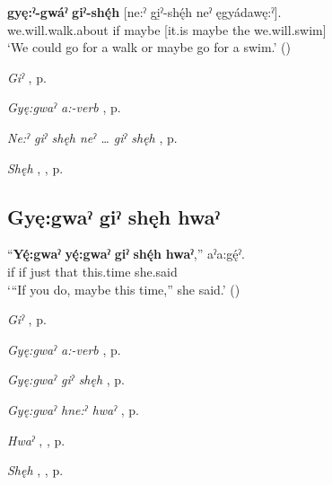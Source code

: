 \ea
\label{ex:gpar141}
 \textbf{gyę:ˀ-gwáˀ} \textbf{giˀ-shę́h} [ne:ˀ gi̱ˀ-shę́h neˀ ęgyádawę:ˀ].\\
we.will.walk.about if maybe [it.is maybe the we.will.swim]\\
\glt ‘We could go for a walk or maybe go for a swim.’ (\cite[45]{michelson_ontario_2011})
\z

\begin{CayugaRelated}
\item \textit{Giˀ} , p. \pageref{p:[giˀ]}\\
\item \textit{Gyę:gwaˀ a:-verb} , p. \pageref{p:[gyę:gwaˀ]}\\
\item \textit{Ne:ˀ giˀ shęh neˀ … giˀ shęh} , p. \pageref{p:[ne:ˀ giˀ shęh neˀ … giˀ shęh]}\\
\item \textit{Shęh} , , p. \pageref{p:[shęh] `because’}
\end{CayugaRelated}


\subsection*{\textbf{Gyę:gwaˀ giˀ shęh hwaˀ} } \label{p:[gyę:gwaˀ giˀ shęh hwaˀ]}

\ea
\label{ex:gpar142}
\gll “\textbf{Yę́:gwaˀ} \textbf{yę́:gwaˀ} \textbf{giˀ} \textbf{shę́h} \textbf{hwaˀ},” aˀa:gę́ˀ.\\
if if just that this.time she.said\\
\glt ‘“If you do, maybe this time,” she said.’ (\cite{henry_de_2005})
\z

\begin{CayugaRelated}
\item \textit{Giˀ} , p. \pageref{p:[giˀ]}\\
\item \textit{Gyę:gwaˀ a:-verb} , p. \pageref{p:[gyę:gwaˀ]}\\
\item \textit{Gyę:gwaˀ giˀ shęh} , p. \pageref{p:[gyę:gwaˀ giˀ shęh]}\\
\item \textit{Gyę:gwaˀ hne:ˀ hwaˀ} , p. \pageref{p:[gyę:gwaˀ hne:ˀ hwaˀ]}\\
\item \textit{Hwaˀ} , , p. \pageref{p:[hwaˀ]}\\
\item \textit{Shęh} , , p. \pageref{p:[shęh] `because’}
\end{CayugaRelated}


